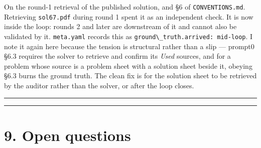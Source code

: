 \documentclass[11pt,a4paper]{article}
\providecommand{\passthrough}[1]{#1}
\begin{document}
On the round-1 retrieval of the published solution, and §6 of
\passthrough{\lstinline!CONVENTIONS.md!}. Retrieving \passthrough{\lstinline!sol67.pdf!} during round 1 spent it as an
independent check. It is now inside the loop: rounds 2 and later are downstream
of it and cannot also be validated by it. \passthrough{\lstinline!meta.yaml!} records this as
\passthrough{\lstinline!ground\_truth.arrived: mid-loop!}. I note it again here because the tension is
structural rather than a slip --- prompt0 §6.3 requires the solver to retrieve and
confirm its \textit{Used} sources, and for a problem whose source is a problem sheet
with a solution sheet beside it, obeying §6.3 burns the ground truth. The clean
fix is for the solution sheet to be retrieved by the auditor rather than the
solver, or after the loop closes.

\begin{center}\rule{0.5\linewidth}{0.5pt}\end{center}

\begin{center}\rule{0.5\linewidth}{0.5pt}\end{center}

\hypertarget{open-questions}{%
\section{9. Open questions}\label{open-questions}}
\end{document}
